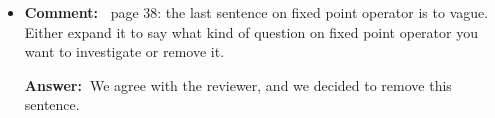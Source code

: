 \documentclass[a4paper]{article}
\newcommand{\ans}{{\bf Answer:\ }}
\newcommand{\cm}[1]{{\bf Comment:\ } #1}
\begin{document}
\begin{itemize}
	\item \cm{page 38: the last sentence on fixed point operator is to vague. Either expand it to say what kind of question on fixed point operator you want to investigate or remove it.}
	
	\ans We agree with the reviewer, and we decided to remove this sentence. 
\end{itemize}




	
\end{document}
